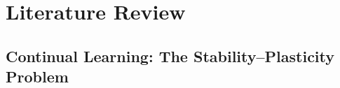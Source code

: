 %
%

\chapter{Literature Review}
\label{ch:literature}

\section{Continual Learning: The Stability--Plasticity Problem}
\label{sec:continual-learning}

